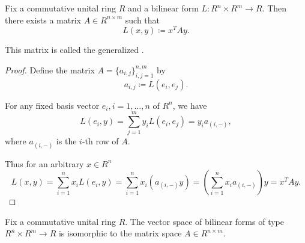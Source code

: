 \begin{theorem}\label{thm:bilinear_form_matrix_presentation}
  Fix a commutative unital ring \( R \) and a bilinear form \( L: R^n \times R^m \to R \). Then there exists a matrix \( A \in R^{n \times m} \) such that
  \begin{equation*}
    L(x, y) \coloneqq x^T A y.
  \end{equation*}

  This matrix is called the generalized .
\end{theorem}
\begin{proof}
  Define the matrix \( A = \{ a_{i,j} \}_{i,j=1}^{n,m} \) by
  \begin{equation*}
    a_{i,j} \coloneqq L(e_i, e_j).
  \end{equation*}

  For any fixed basis vector \( e_i, i = 1, \ldots, n \) of \( R^n \), we have
  \begin{equation*}
    L(e_i, y)
    =
    \sum_{j=1}^m y_i L(e_i, e_j)
    =
    y_i a_{(i,-)},
  \end{equation*}
  where \( a_{(i,-)} \) is the \( i \)-th row of \( A \).

  Thus for an arbitrary \( x \in R^n \)
  \begin{equation*}
    L(x, y)
    =
    \sum_{i=1}^n x_i L(e_i, y)
    =
    \sum_{i=1}^n x_i (a_{(i,-)} y)
    =
    \left( \sum_{i=1}^n x_i a_{(i,-)} \right) y
    =
    x^T A y.
  \end{equation*}
\end{proof}

\begin{corollary}\label{thm:bilinear_forms_isomorphic_to_matrices}
  Fix a commutative unital ring \( R \). The vector space of bilinear forms of type \( R^n \times R^m \to R \) is isomorphic to the matrix space \( A \in R^{n \times m} \).
\end{corollary}
